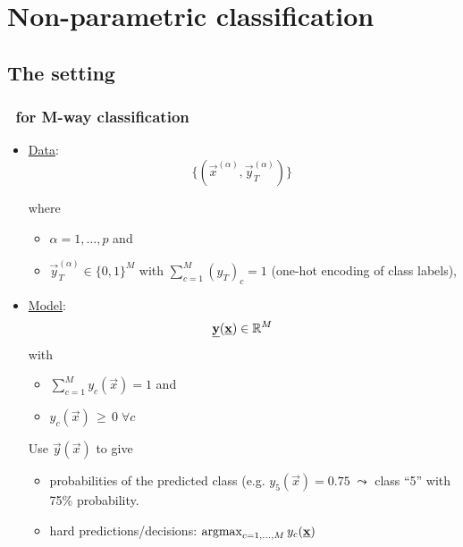 \section{Non-parametric classification}

\subsection{The setting}

\begin{frame}\frametitle{\subsecname~for M-way classification}


\begin{itemize}
	\item \underline{Data}:\\

	\begin{equation*}
	\Big\{ \left(\vec x^{(\alpha)}, \vec y^{(\alpha)}_{T} \right) \Big\}\,
	\end{equation*}

	where 
	\begin{itemize}
	\item[] $\alpha = 1,\ldots,p$ and
	\item[]$\vec y_T^{(\alpha)} \in \{0, 1\}^M$ with $\sum_{c=1}^{M} (y_{T})_c = 1$ (one-hot encoding of class labels),
	\end{itemize}

	\pause

	\item \underline{Model}:\\

	\begin{equation*}
	\underline{\mathbf{y}}(\underline{\mathbf{x}}) \in \mathbb{R}^M 
	\end{equation*}
	with 
	\begin{itemize}
	\item[] $\sum_{c=1}^{M} y_c(\vec x) = 1$ and
	\item[] $y_c(\vec x)\,\ge\,0\; \forall c$
	\end{itemize}
	
	Use $\vec y(\vec x)$ to give
	\begin{itemize}
	\item probabilities of the predicted class (e.g. $y_5(\vec x) = 0.75\; \leadsto$ class ``5'' with 75\% probability.
	\item hard predictions/decisions: $\argmax_{c=1,\ldots,M} y_c(\vec x)$
	\end{itemize}

\end{itemize}

\end{frame}

